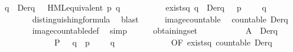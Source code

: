 \begin{isabellebody}
\ {\isacartoucheopen}{\isasymforall}q{\isacharprime}{\kern0pt}\ {\isasymin}\ Der{\isacharparenleft}{\kern0pt}q{\isacharcomma}{\kern0pt}\ {\isasymalpha}{\isacharparenright}{\kern0pt}{\isachardot}{\kern0pt}\ {\isasymnot}\ HML{\isacharunderscore}{\kern0pt}equivalent\ p{\isacharprime}{\kern0pt}\ q{\isacharprime}{\kern0pt}{\isacartoucheclose}\isanewline
\ \ \ \ \isanewline
\ \ \ \ \isamarkupfalse%
\ {\isachardoublequoteopen}exists{\isacharunderscore}{\kern0pt}{\isasymphi}\isactrlbsub q{\isacharprime}{\kern0pt}\isactrlesub {\isachardoublequoteclose}{\isacharcolon}{\kern0pt}\ {\isacartoucheopen}{\isasymforall}q{\isacharprime}{\kern0pt}\ {\isasymin}\ Der{\isacharparenleft}{\kern0pt}q{\isacharcomma}{\kern0pt}\ {\isasymalpha}{\isacharparenright}{\kern0pt}{\isachardot}{\kern0pt}\ {\isasymexists}{\isasymphi}{\isachardot}{\kern0pt}\ p{\isacharprime}{\kern0pt}\ {\isasymTurnstile}\ {\isasymphi}\ {\isasymand}\ {\isasymnot}\ q{\isacharprime}{\kern0pt}\ {\isasymTurnstile}\ {\isasymphi}{\isacartoucheclose}\isanewline
\ \ \ \ \ \ \isamarkupfalse%
\ distinguishing{\isacharunderscore}{\kern0pt}formula\ \isamarkupfalse%
\ blast\isanewline
\isanewline
\ \ \ \ \isamarkupfalse%
\ {\isacartoucheopen}image{\isacharunderscore}{\kern0pt}countable{\isacartoucheclose}\ \isamarkupfalse%
\ {\isacartoucheopen}countable\ Der{\isacharparenleft}{\kern0pt}q{\isacharcomma}{\kern0pt}\ {\isasymalpha}{\isacharparenright}{\kern0pt}{\isacartoucheclose}\ \isanewline
\ \ \ \ \ \ \isamarkupfalse%
\ image{\isacharunderscore}{\kern0pt}countable{\isacharunderscore}{\kern0pt}def\ \isamarkupfalse%
\ simp\isanewline
\isanewline
\ \ \ \ \isamarkupfalse%
\ obtaining{\isacharunderscore}{\kern0pt}set{\isacharbrackleft}{\kern0pt}\isanewline
\ \ \ \ \ \ \ \ \ \ \ {\isacharquery}{\kern0pt}A\ {\isacharequal}{\kern0pt}\ {\isacartoucheopen}Der{\isacharparenleft}{\kern0pt}q{\isacharcomma}{\kern0pt}\ {\isasymalpha}{\isacharparenright}{\kern0pt}{\isacartoucheclose}\isanewline
\ \ \ \ \ \ \ \ \ \ \ \ \ {\isacharquery}{\kern0pt}P\ {\isacharequal}{\kern0pt}\ {\isacartoucheopen}{\isasymlambda}\ q{\isacharprime}{\kern0pt}\ {\isasymphi}{\isachardot}{\kern0pt}\ p{\isacharprime}{\kern0pt}\ {\isasymTurnstile}\ {\isasymphi}\ {\isasymand}\ {\isasymnot}\ q{\isacharprime}{\kern0pt}\ {\isasymTurnstile}\ {\isasymphi}{\isacartoucheclose}{\isacharcomma}{\kern0pt}\ \isanewline
\ \ \ \ \ \ \ \ \ \ OF\ {\isachardoublequoteopen}exists{\isacharunderscore}{\kern0pt}{\isasymphi}\isactrlbsub q{\isacharprime}{\kern0pt}\isactrlesub {\isachardoublequoteclose}\ {\isacartoucheopen}countable\ Der{\isacharparenleft}{\kern0pt}q{\isacharcomma}{\kern0pt}\ {\isasymalpha}{\isacharparenright}{\kern0pt}{\isacartoucheclose}{\isacharbrackright}{\kern0pt}\isanewline

\end{isabellebody}

